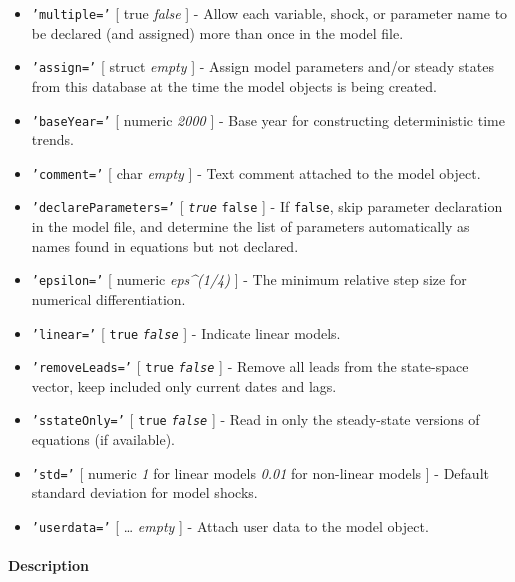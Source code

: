  \begin{itemize}
 \item
   \texttt{'multiple='} {[} true \textbar{} \emph{false} {]} - Allow each
   variable, shock, or parameter name to be declared (and assigned) more
   than once in the model file.
 \item
   \texttt{'assign='} {[} struct \textbar{} \emph{empty} {]} - Assign
   model parameters and/or steady states from this database at the time
   the model objects is being created.
 \item
   \texttt{'baseYear='} {[} numeric \textbar{} \emph{2000} {]} - Base
   year for constructing deterministic time trends.
 \item
   \texttt{'comment='} {[} char \textbar{} \emph{empty} {]} - Text
   comment attached to the model object.
 \item
   \texttt{'declareParameters='} {[} \emph{\texttt{true}} \textbar{}
   \texttt{false} {]} - If \texttt{false}, skip parameter declaration in
   the model file, and determine the list of parameters automatically as
   names found in equations but not declared.
 \item
   \texttt{'epsilon='} {[} numeric \textbar{} \emph{eps\^{}(1/4)} {]} -
   The minimum relative step size for numerical differentiation.
 \item
   \texttt{'linear='} {[} \texttt{true} \textbar{} \emph{\texttt{false}}
   {]} - Indicate linear models.
 \item
   \texttt{'removeLeads='} {[} \texttt{true} \textbar{}
   \emph{\texttt{false}} {]} - Remove all leads from the state-space
   vector, keep included only current dates and lags.
 \item
   \texttt{'sstateOnly='} {[} \texttt{true} \textbar{}
   \emph{\texttt{false}} {]} - Read in only the steady-state versions of
   equations (if available).
 \item
   \texttt{'std='} {[} numeric \textbar{} \emph{1} for linear models
   \textbar{} \emph{0.01} for non-linear models {]} - Default standard
   deviation for model shocks.
 \item
   \texttt{'userdata='} {[} \ldots{} \textbar{} \emph{empty} {]} - Attach
   user data to the model object.
 \end{itemize}
 
 \paragraph{Description}
 
